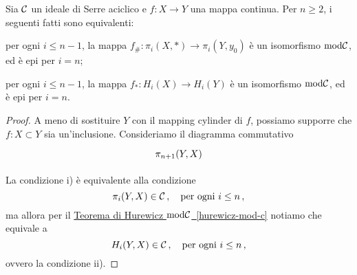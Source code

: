 \begin{thm}
	Sia $\mathcal{C}$ un ideale di Serre aciclico e $f:X \to Y$
	una mappa continua. Per $n \ge 2$, i seguenti fatti sono equivalenti:
	\begin{rmnumerate}
		\item per ogni $i \le n-1$, la mappa $f_{\#}:\pi_{i}(X, \ast) \to \pi_{i}(Y,y_{0})$
		è un isomorfismo $\mathrm{mod}\mathcal{C}$, ed è epi per $i=n$;
		
		\item per ogni $i \le n-1$, la mappa $f_{*}:H_{i}(X) \to H_{i}(Y)$
		è un isomorfismo $\mathrm{mod}\mathcal{C}$, ed è epi per $i=n$.
	\end{rmnumerate}
	\begin{proof}
		A meno di sostituire $Y$ con il mapping cylinder di $f$,
		possiamo supporre che $f : X \subset Y$ sia un'inclusione.
		Consideriamo il diagramma commutativo
		\begin{equation*}
			\begin{tikzcd}
				\pi_{n+1}(Y,X)
			\end{tikzcd}
		\end{equation*}
		
		La condizione i)  è equivalente alla condizione
		\begin{equation*}
			\pi_{i}(Y,X) \in \mathcal{C}\,, \quad \text{per ogni } i \le n\,,
		\end{equation*}
		ma allora per il \hyperref[hurewicz-mod-c]{Teorema di Hurewicz $\mathrm{mod}\mathcal{C}$~\ref{hurewicz-mod-c}} notiamo che equivale a
		\begin{equation*}
			H_{i}(Y,X) \in \mathcal{C}\,, \quad \text{per ogni } i \le n\,,
		\end{equation*}
		ovvero la condizione ii).
	\end{proof}
\end{thm}

